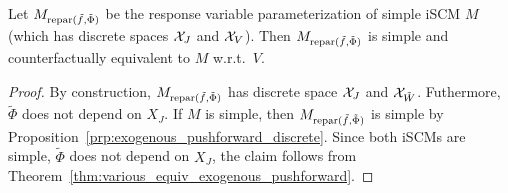 \begin{Thm}\label{thm:response_variable_encoding}
  Let $M_{\mathrm{repar}({\tilde{f}},{\tilde\Phi})}$ be the response variable parameterization of simple iSCM $M$ (which has discrete spaces $\mathcal{X}_J$ and $\mathcal{X}_V$).
  Then $M_{\mathrm{repar}({\tilde{f}},{\tilde\Phi})}$ is simple and counterfactually equivalent to $M$ w.r.t.\ $V$.
\end{Thm}
\begin{proof}
  By construction, $M_{\mathrm{repar}({\tilde{f}},{\tilde\Phi})}$ has discrete space $\mathcal{X}_J$ and $\mathcal{X}_{\tilde W}$.
  Futhermore, $\tilde\Phi$ does not depend on $X_J$.
  If $M$ is simple, then $M_{\mathrm{repar}({\tilde{f}},{\tilde\Phi})}$ is simple by Proposition~\ref{prp:exogenous_pushforward_discrete}.
  Since both iSCMs are simple, $\tilde\Phi$ does not depend on $X_J$, the claim follows from Theorem~\ref{thm:various_equiv_exogenous_pushforward}.
\end{proof}

